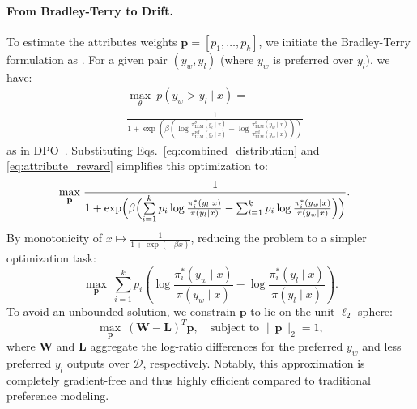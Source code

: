 \paragraph{From Bradley-Terry to Drift.} 
To estimate the attributes weights $\mathbf{p} = [p_1, \dots, p_k]$, we initiate the Bradley-Terry formulation as \citet{rafailov2024direct}. For a given pair $(y_w, y_l)$ (where $y_w$ is preferred over $y_l$), we have:
\begin{align}
    &\max_{\theta} \ p(y_w > y_l \mid x) = \nonumber \\
    &\frac{1}{1 + \exp\left(\beta\left(\log\frac{\pi_\text{LLM}^{\theta}(y_l \mid x)}{\pi_\text{LLM}^{\text{ref}}(y_l \mid x)} - \log\frac{\pi_\text{LLM}^{\theta}(y_w \mid x)}{\pi_\text{LLM}^{\text{ref}}(y_w \mid x)}\right)\right)}\nonumber
\end{align}
as in DPO~\citep{rafailov2024direct}. 
Substituting Eqs.~\ref{eq:combined_distribution} and \ref{eq:attribute_reward} simplifies this optimization to:
{\tiny
\begin{align}
\max_{\mathbf{p}}\; &\frac{1}{1 + \exp\Bigl(\beta \Bigl(\sum\limits_{i=1}^k p_i \log\frac{\pi^*_i(y_l \mid x)}{\pi(y_l \mid x)} \nonumber - \sum_{i=1}^k p_i \log\frac{\pi^*_i(y_w \mid x)}{\pi(y_w \mid x)}\Bigr)\Bigr)}.
\end{align}}
By monotonicity of $x \mapsto \frac{1}{1 + \exp(-\beta x)}$, reducing the problem to a simpler optimization task:
\begin{equation}
    \max_{\mathbf{p}} \ \sum_{i=1}^k p_i \left(\log\frac{\pi_i^*(y_w \mid x)}{\pi(y_w \mid x)} - \log\frac{\pi_i^*(y_l \mid x)}{\pi(y_l \mid x)}\right).\nonumber
\end{equation}
To avoid an unbounded solution, we constrain $\mathbf{p}$ to lie on the unit $\ell_2$ sphere:
\begin{equation}
    \max_{\mathbf{p}} \ \left(\mathbf{W} - \mathbf{L}\right)^T \mathbf{p}, \quad \text{subject to } \|\mathbf{p}\|_2 = 1,
\end{equation}
where $\mathbf{W}$ and $\mathbf{L}$ aggregate the log-ratio differences for the preferred $y_w$ and less preferred $y_l$ outputs over $\mathcal{D}$, respectively. 
Notably, this approximation is completely gradient-free and thus highly efficient compared to traditional preference modeling.

